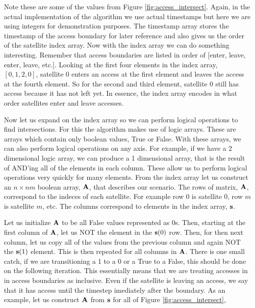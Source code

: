 Note these are some of the values from Figure \ref{fig:access_intersect}.
Again, in the actual implementation of the algorithm we use actual timestamps
but here we are using integers for demonstration purposes. The timestamp array
stores the timestamp of the access boundary for later reference and also gives
us the order of the satellite index array. Now with the index array we can do
something interesting. Remember that access boundaries are listed in order of
[enter, leave, enter, leave, etc.]. Looking at the first four elements in the
index array, $[0, 1, 2, 0]$, satellite 0 enters an access at the first element
and leaves the access at the fourth element. So for the second and third
element, satellite 0 still has access because it has not left yet. In essence,
the index array encodes in what order satellites enter and leave accesses. 

Now let us expand on the index array so we can perform logical operations to
find intersections. For this the algorithm makes use of logic arrays.  These
are arrays which contain only boolean values, True or False. With these arrays,
we can also perform logical operations on any axis. For example, if we have a 2
dimensional logic array, we can produce a 1 dimensional array, that is the
result of AND'ing all of the elements in each column. These allow us to perform
logical operations very quickly for many elements. From the index array let us
construct an $n\times nm$ boolean array, $\bm{\mathrm{A}}$, that describes our scenario.
The rows of matrix, $\bm{\mathrm{A}}$, correspond to the indeces of each satellite.  For
example row 0 is satellite 0, row $m$ is satellite $m$, etc. The columns
correspond to elements in the index array, $\bm{\mathrm{s}}$.

Let us initialize $\bm{\mathrm{A}}$ to be all False values represented as 0s. Then,
starting at the first column of $\bm{\mathrm{A}}$, let us NOT the element in the
$\bm{\mathrm{s}}(0)$ row.  Then, for then next column, let us copy all of the values
from the previous column and again NOT the $\bm{\mathrm{s}}(1)$ element. This is then
repeated for all columns in $\bm{\mathrm{A}}$. There is one small catch, if we are
transitioning a 1 to a 0 or a True to a False, this should be done on the
following iteration. This essentially means that we are treating accesses in in
access boundaries as inclusive. Even if the satellite is leaving an access, we
say that it has access until the timestep imediately after the boundary. As an
example, let us construct $\bm{\mathrm{A}}$ from $\bm{\mathrm{s}}$ for all of Figure
\ref{fig:access_intersect},

